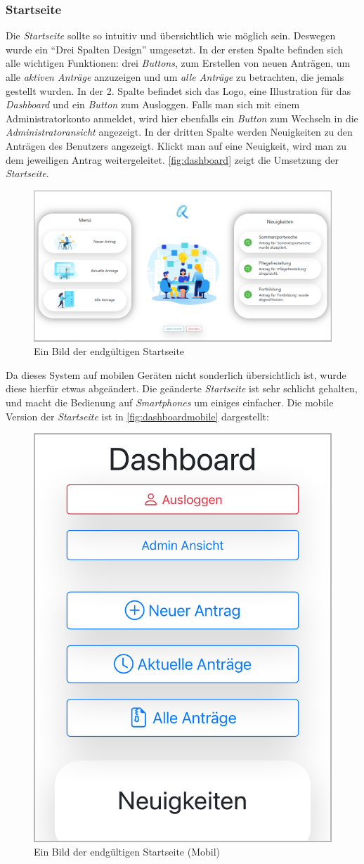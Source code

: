 \subsubsection{Startseite}
\label{chapter:implementierung-frontend-komponenten-startseite}
Die \textit{Startseite} sollte so intuitiv und übersichtlich wie möglich sein. Deswegen wurde ein \enquote{Drei Spalten Design} umgesetzt. In der ersten Spalte befinden sich alle wichtigen Funktionen: drei \textit{Buttons}, zum Erstellen von neuen Anträgen, um alle \textit{aktiven Anträge} anzuzeigen und um \textit{alle Anträge} zu betrachten, die jemals gestellt wurden. In der 2. Spalte befindet sich das Logo, eine Illustration für das \textit{Dashboard} und ein \textit{Button} zum Ausloggen. Falls man sich mit einem Administratorkonto anmeldet, wird hier ebenfalls ein \textit{Button} zum Wechseln in die \textit{Administratoransicht} angezeigt. In der dritten Spalte werden Neuigkeiten zu den Anträgen des Benutzers angezeigt. Klickt man auf eine Neuigkeit, wird man zu dem jeweiligen Antrag weitergeleitet. \autoref{fig:dashboard} zeigt die Umsetzung der \textit{Startseite}.
\begin{figure}[H]
	\centering
	\includegraphics[width=1\linewidth]{images/ldehner_implementierung/dashboard}
	\caption[Dashboard Seite]{Ein Bild der endgültigen Startseite}
	\label{fig:dashboard}
\end{figure}
Da dieses System auf mobilen Geräten nicht sonderlich übersichtlich ist, wurde diese hierfür etwas abgeändert. Die geänderte \textit{Startseite} ist sehr schlicht gehalten, und macht die Bedienung auf \textit{Smartphones} um einiges einfacher. Die mobile Version der \textit{Startseite} ist in \autoref{fig:dashboardmobile} dargestellt:
\begin{figure}[H]
	\centering
	\includegraphics[width=0.3\linewidth]{images/ldehner_implementierung/dashboard_mobile}
	\caption[Dashboard Mobil Seite]{Ein Bild der endgültigen Startseite (Mobil)}
	\label{fig:dashboardmobile}
\end{figure}

